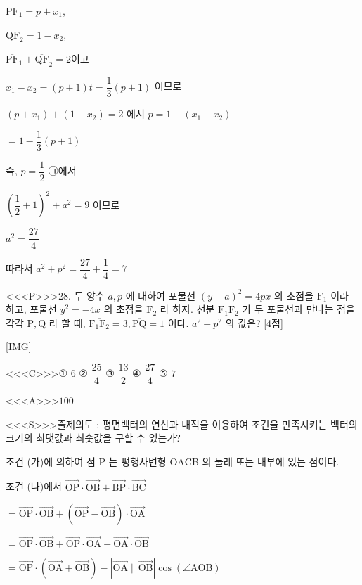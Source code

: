 \documentclass{oblivoir}
\begin{document}
$\overline{\mathrm{PF}}_{1}=p+x_{1}$,

$\overline{\mathrm{QF}_{2}}=1-x_{2}$,

$\overline{\mathrm{PF}}_{1}+\overline{\mathrm{QF}}_{2}=2$이고

$x_{1}-x_{2}=(p+1) t=\dfrac{1}{3}(p+1)$
이므로

$\left(p+x_{1}\right)+\left(1-x_{2}\right)=2$
에서
$p=1-\left(x_{1}-x_{2}\right)$

$=1-\dfrac{1}{3}(p+1)$

즉, $p=\dfrac{1}{2}$
㉠에서

$\left(\dfrac{1}{2}+1\right)^{2}+a^{2}=9$
이므로

$a^{2}=\dfrac{27}{4}$

따라서
$a^{2}+p^{2}=\dfrac{27}{4}+\dfrac{1}{4}=7$


<<<P>>>28. 두 양수 $a, p$ 에 대하여 포물선 $(y-a)^{2}=4 p x$ 의 초점을 $\mathrm{F}_{1}$ 이라 하고, 포물선 $y^{2}=-4 x$ 의 초점을 $\mathrm{F}_{2}$ 라 하자. 선분 $\mathrm{F}_{1} \mathrm{F}_{2}$ 가 두 포물선과 만나는 점을 각각 $\mathrm{P}, \mathrm{Q}$ 라 할 때, $\overline{\mathrm{F}_{1} \mathrm{F}_{2}}=3, \overline{\mathrm{PQ}}=1$ 이다. $a^{2}+p^{2}$ 의 값은? [4점]

[IMG]


<<<C>>>① $6$
② $\dfrac{25}{4}$
③ $\dfrac{13}{2}$
④ $\dfrac{27}{4}$
⑤ $7$


<<<A>>>$100$

<<<S>>>출제의도 : 평면벡터의 연산과 내적을 이용하여 조건을 만족시키는 벡터의 크기의 최댓값과 최솟값을 구할 수 있는가?

조건 (가)에 의하여 점 $\mathrm{P}$ 는 평행사변형 $\mathrm{OACB}$ 의 둘레 또는 내부에 있는 점이다.

조건 (나)에서
$\overrightarrow{\mathrm{OP}} \cdot \overrightarrow{\mathrm{OB}}+\overrightarrow{\mathrm{BP}} \cdot \overrightarrow{\mathrm{BC}}$

$=\overrightarrow{\mathrm{OP}} \cdot \overrightarrow{\mathrm{OB}}+(\overrightarrow{\mathrm{OP}}-\overrightarrow{\mathrm{OB}}) \cdot \overrightarrow{\mathrm{OA}}$

$=\overrightarrow{\mathrm{OP}} \cdot \overrightarrow{\mathrm{OB}}+\overrightarrow{\mathrm{OP}} \cdot \overrightarrow{\mathrm{OA}}-\overrightarrow{\mathrm{OA}} \cdot \overrightarrow{\mathrm{OB}}$

$=\overrightarrow{\mathrm{OP}} \cdot(\overrightarrow{\mathrm{OA}}+\overrightarrow{\mathrm{OB}})-|\overrightarrow{\mathrm{OA}} \| \overrightarrow{\mathrm{OB}}| \cos (\angle \mathrm{AOB})$
\end{document}
